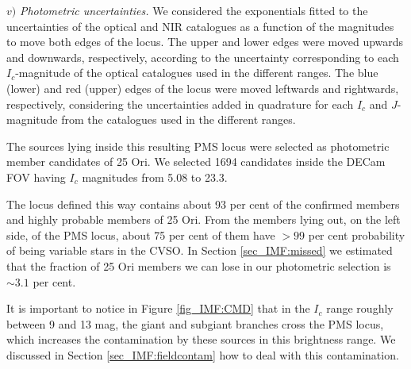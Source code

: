 \documentclass[12pt]{article}
\begin{document}
$v)$ \emph{Photometric uncertainties.} We considered the exponentials fitted to the uncertainties of the optical and NIR catalogues as a function of the magnitudes to move both edges of the locus. The upper and lower edges were moved upwards and downwards, respectively, according to the uncertainty corresponding to each $I_c$-magnitude of the optical catalogues used in the different ranges. The blue (lower) and red (upper) edges of the locus were moved leftwards and rightwards, respectively, considering the uncertainties added in quadrature for each $I_c$ and $J$-magnitude from the catalogues used in the different ranges.

The sources lying inside this resulting PMS locus were selected as photometric member candidates of 25 Ori. We selected 1694 candidates inside the DECam FOV having $I_c$ magnitudes from 5.08 to 23.3.

The locus defined this way contains about 93 per cent of the confirmed members and highly probable members of 25 Ori. From the members lying out, on the left side, of the PMS locus, about 75 per cent of them have $>99$ per cent probability of being variable stars in the CVSO. In Section \ref{sec_IMF:missed} we estimated that the fraction of 25 Ori members we can lose in our photometric selection is $\sim3.1$ per cent.

It is important to notice in Figure \ref{fig_IMF:CMD} that in the $I_c$ range roughly between 9 and 13 mag, the giant and subgiant branches cross the PMS locus, which increases the contamination by these sources in this brightness range. We discussed in Section \ref{sec_IMF:fieldcontam} how to deal with this contamination. %


\end{document}

